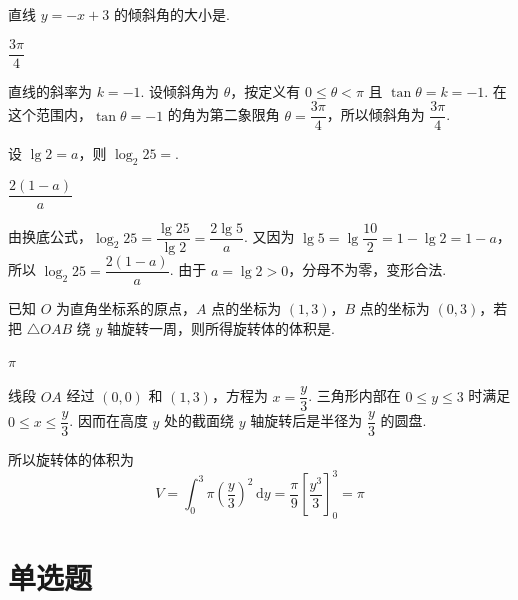 \begin{problem}

直线 \(y=-x+3\) 的倾斜角的大小是\fillinblank{}.

\begin{answer}
\(\dfrac{3\pi}{4}\)
\end{answer}

\begin{solution}
直线的斜率为 \(k=-1\). 设倾斜角为 \(\theta\)，按定义有 \(0\leqslant\theta<\pi\) 且 \(\tan\theta=k=-1\). 在这个范围内，\(\tan\theta=-1\) 的角为第二象限角 \(\theta=\dfrac{3\pi}{4}\)，所以倾斜角为 \(\dfrac{3\pi}{4}\).
\end{solution}
\end{problem}

\begin{problem}

设 \(\lg 2=a\)，则 \(\log_2 25=\)\fillinblank{}.

\begin{answer}
\(\dfrac{2(1-a)}{a}\)
\end{answer}

\begin{solution}
由换底公式，\(\log_2 25=\dfrac{\lg25}{\lg2}=\dfrac{2\lg5}{a}\). 又因为 \(\lg5=\lg\dfrac{10}{2}=1-\lg2=1-a\)，所以 \(\log_2 25=\dfrac{2(1-a)}{a}\). 由于 \(a=\lg2>0\)，分母不为零，变形合法.
\end{solution}
\end{problem}

\begin{problem}

已知 \(O\) 为直角坐标系的原点，\(A\) 点的坐标为 \((1,3)\)，\(B\) 点的坐标为 \((0,3)\)，若把 \(\triangle OAB\) 绕 \(y\) 轴旋转一周，则所得旋转体的体积是\fillinblank{}.

\begin{answer}
\(\pi\)
\end{answer}

\begin{solution}
线段 \(OA\) 经过 \((0,0)\) 和 \((1,3)\)，方程为 \(x=\dfrac{y}{3}\). 三角形内部在 \(0\leqslant y\leqslant3\) 时满足 \(0\leqslant x\leqslant\dfrac{y}{3}\). 因而在高度 \(y\) 处的截面绕 \(y\) 轴旋转后是半径为 \(\dfrac{y}{3}\) 的圆盘.

所以旋转体的体积为
\[
V=\int_0^3\pi\left(\frac{y}{3}\right)^2\,\mathrm{d}y=\frac{\pi}{9}\left[\frac{y^3}{3}\right]_0^3=\pi
\]
\end{solution}
\end{problem}

\section{单选题}

